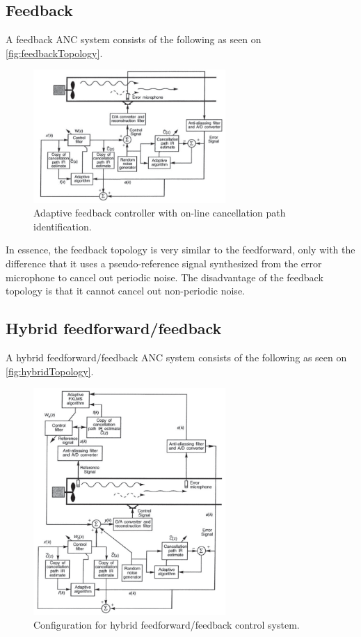 \subsection{Feedback}
A feedback ANC system consists of the following as seen on \autoref{fig:feedbackTopology}.
\begin{figure}[H]
	\centering
	\includegraphics[width=0.65\textwidth]{figures/BasicSystem/feedback}
	\caption{Adaptive feedback controller with on-line cancellation path identification. \cite{Hansen2}}
	\label{fig:feedbackTopology}
\end{figure}

In essence, the feedback topology is very similar to the feedforward, only with the difference that it uses a pseudo-reference signal synthesized from the error microphone to cancel out periodic noise. The disadvantage of the feedback topology is that it cannot cancel out non-periodic noise.    



\subsection{Hybrid feedforward/feedback}    
A hybrid feedforward/feedback ANC system consists of the following as seen on \autoref{fig:hybridTopology}.
\begin{figure}[H]
	\centering
	\includegraphics[width=0.65\textwidth]{figures/BasicSystem/hybrid}
	\caption{Configuration for hybrid feedforward/feedback control system. \cite{Hansen2}}
	\label{fig:hybridTopology}
\end{figure}

